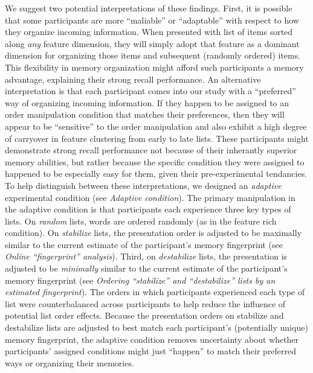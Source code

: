 \documentclass[11pt]{article}
\begin{document}
We suggest two potential interpretations of these findings. First, it is
possible that some participants are more ``maliable'' or ``adaptable'' with
respect to how they organize incoming information. When presented with list of
items sorted along \textit{any} feature dimension, they will simply adopt that
feature as a dominant dimension for organizing those items and subsequent
(randomly ordered) items. This flexibility in memory organization might afford
such participants a memory advantage, explaining their strong recall
performance. An alternative interpretation is that each participant comes into
our study with a ``preferred'' way of organizing incoming information. If they
happen to be assigned to an order manipulation condition that matches their
preferences, then they will appear to be ``sensitive'' to the order
manipulation and also exhibit a high degree of carryover in feature clustering
from early to late lists. These participants might demonstrate strong recall
performance not because of their inherantly superior memory abilities, but
rather because the specific condition they were assigned to happened to be
especially easy for them, given their pre-experimental tendancies. To help
distinguish between these interpretations, we designed an \textit{adaptive}
experimental condition (see \textit{Adaptive condition}). The primary
manipulation in the adaptive condition is that participants each experience
three key types of lists. On \textit{random} lists, words are ordered randomly
(as in the feature rich condition). On \textit{stabilize} lists, the
presentation order is adjusted to be maximally similar to the current estimate
of the participant's memory fingerprint (see \textit{Online “fingerprint”
analysis}). Third, on \textit{destabilize} lists, the presentation is adjusted
to be \textit{minimally} similar to the current estimate of the participant's
memory fingerprint (see \textit{Ordering ``stabilize'' and ``destabilize''
lists by an estimated fingerprint}). The orders in which participants
experienced each type of list were counterbalanced across participants to help
reduce the influence of potential list order effects. Because the presentation
orders on stabilize and destabilize lists are adjusted to best match each
participant's (potentially unique) memory fingerprint, the adaptive condition
removes uncertainty about whether participants' assigned conditions might just
``happen'' to match their preferred ways or organizing their memories.
\end{document}
